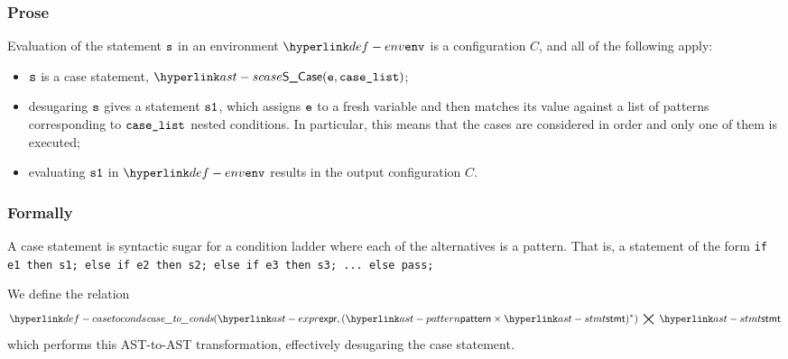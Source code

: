 \subsubsection{Prose}
Evaluation of the statement $\texttt{s}$ in an environment $\env$ is a configuration $C$,
and all of the following apply:
\begin{itemize}
  \item $\texttt{s}$ is a case statement, $\SCase(\ve, \caselist)$;
  \item desugaring $\texttt{s}$ gives a statement $\texttt{s1}$, which assigns $\texttt{e}$ to a fresh variable
  and then matches its value against a list of patterns corresponding to $\texttt{case\_list}$ nested conditions.
  In particular, this means that the cases are considered in order and only one of them is executed;
  \item evaluating $\texttt{s1}$ in $\env$ results in the output configuration $C$.
\end{itemize}

\subsubsection{Formally}
\hypertarget{def-casetoconds}{}
A case statement is syntactic sugar for a condition ladder where each
of the alternatives is a pattern.
That is, a statement of the form
\texttt{if e1 then s1; else if e2 then s2; else if e3 then s3; ... else pass;}

We define the relation
\[
  \casetoconds(\expr, (\pattern \times \stmt)^*) \;\bigtimes\; \stmt
\]
which performs this AST-to-AST transformation, effectively desugaring
the case statement.


